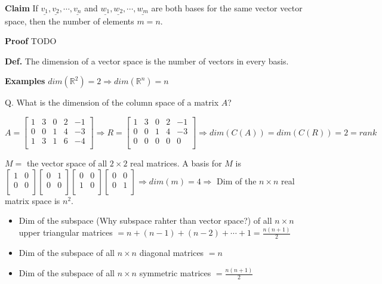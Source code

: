 \documentclass[12pt,a4paper]{article}
\begin{document}
\textbf{Claim} If $\underline{v_1}, \underline{v_2}, \cdots, \underline{v_n}$ and $\underline{w_1}, \underline{w_2}, \cdots, \underline{w_m}$ 
are both bases for the same vector vector space, then the number of elements \textcolor{orange!100}{$m = n$}.

\textbf{Proof} TODO

\textbf{Def.} The \textcolor{orange!100}{dimension} of a vector space is the number of vectors in every basis.

\textbf{Examples} $dim(\mathbb{R}^2) = 2 \Rightarrow dim(\mathbb{R}^n) = n$

Q. What is the dimension of the column space of a matrix $A$?

\[
A = 
\begin{bmatrix}
  1 & 3 & 0 & 2 & -1 \\
  0 & 0 & 1 & 4 & -3 \\
  1 & 3 & 1 & 6 & -4 \\ 
\end{bmatrix}
\Rightarrow
R = 
\begin{bmatrix}
  1 & 3 & 0 & 2 & -1 \\
  0 & 0 & 1 & 4 & -3 \\
  0 & 0 & 0 & 0 & 0 \\
\end{bmatrix}
\Rightarrow dim(C(A)) = dim(C(R)) = 2 = rank
\]

$M = $ the vector space of all $2 \times 2$ real matrices.
A basis for $M$ is
$
\begin{bmatrix}
  1 & 0 \\
  0 & 0 \\
\end{bmatrix}
\begin{bmatrix}
  0 & 1 \\
  0 & 0 \\
\end{bmatrix}
\begin{bmatrix}
  0 & 0 \\
  1 & 0 \\
\end{bmatrix}
\begin{bmatrix}
  0 & 0 \\
  0 & 1 \\
\end{bmatrix} 
\Rightarrow dim(m) = 4
\Rightarrow
$
Dim of the $n \times n$ real matrix space is $n^2$.

\begin{itemize}
  \item Dim of the subspace (Why subspace rahter than vector space?) of all $n \times n$ upper triangular matrices $ = n + (n-1) + (n-2) + \cdots + 1 = \frac{n(n+1)}{2}$
  \item Dim of the subspace of all $n \times n$ diagonal matrices $ = n$
  \item Dim of the subspace of all $n \times n$ symmetric matrices $ = \frac{n(n+1)}{2}$
\end{itemize}
\end{document}
